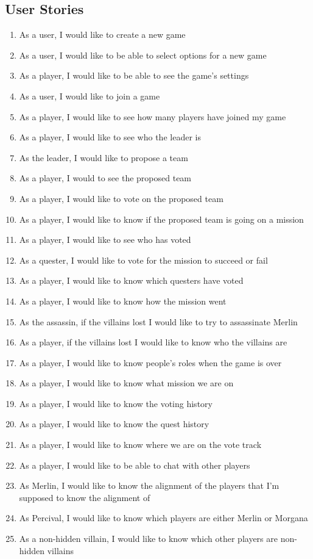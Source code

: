 \documentclass{hitec}
\begin{document}
\subsection{User Stories}
\begin{enumerate}
\item As a user, I would like to create a new game
\item As a user, I would like to be able to select options for a new game
\item As a player, I would like to be able to see the game’s settings
\item As a user, I would like to join a game
\item As a player, I would like to see how many players have joined my game
\item As a player, I would like to see who the leader is
\item As the leader, I would like to propose a team
\item As a player, I would to see the proposed team
\item As a player, I would like to vote on the proposed team
\item As a player, I would like to know if the proposed team is going on a mission
\item As a player, I would like to see who has voted
\item As a quester, I would like to vote for the mission to succeed or fail
\item As a player, I would like to know which questers have voted
\item As a player, I would like to know how the mission went
\item As the assassin, if the villains lost I would like to try to assassinate Merlin
\item As a player, if the villains lost I would like to know who the villains are
\item As a player, I would like to know people’s roles when the game is over
\item As a player, I would like to know what mission we are on
\item As a player, I would like to know the voting history
\item As a player, I would like to know the quest history
\item As a player, I would like to know where we are on the vote track
\item As a player, I would like to be able to chat with other players
\item As Merlin, I would like to know the alignment of the players that I’m supposed to know the alignment of
\item As Percival, I would like to know which players are either Merlin or Morgana
\item As a non-hidden villain, I would like to know which other players are non-hidden villains

\end{enumerate}
\end{document}
